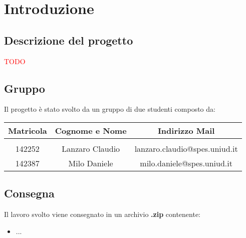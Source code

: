 \chapter{Introduzione}

    \section{Descrizione del progetto}
    \textcolor{red}{TODO}
    
    \section{Gruppo}
    Il progetto è stato svolto da un gruppo di due studenti composto da:
    
        \begin{center}
        \begin{tabular}{ccc}
        \textbf{Matricola} & \textbf{Cognome e Nome} & \textbf{Indirizzo Mail}\\[1ex]
        \hline \\
            142252 & Lanzaro Claudio & lanzaro.claudio@spes.uniud.it\\[1ex]	142387 & Milo Daniele & milo.daniele@spes.uniud.it\\[1ex]
        \end{tabular}
        \end{center}

    \section{Consegna}
    Il lavoro svolto viene consegnato in un archivio \textbf{.zip} contenente:
    \begin{itemize}
        \item ...
    \end{itemize}
    